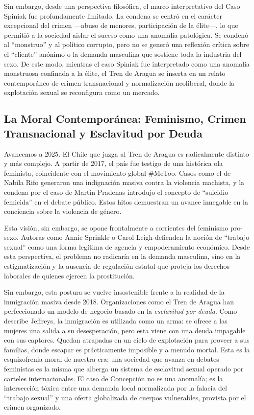 \documentclass[12pt, a4paper]{article}
\begin{document}
Sin embargo, desde una perspectiva filosófica, el marco interpretativo del Caso Spiniak fue profundamente limitado. La condena se centró en el carácter excepcional del crimen —abuso de menores, participación de la élite—, lo que permitió a la sociedad aislar el suceso como una anomalía patológica. Se condenó al ``monstruo'' y al político corrupto, pero no se generó una reflexión crítica sobre el ``cliente'' anónimo o la demanda masculina que sostiene toda la industria del sexo. De este modo, mientras el caso Spiniak fue interpretado como una anomalía monstruosa confinada a la élite, el Tren de Aragua se inserta en un relato contemporáneo de crimen transnacional y normalización neoliberal, donde la explotación sexual se reconfigura como un mercado.

\subsection*{La Moral Contemporánea: Feminismo, Crimen Transnacional y Esclavitud por Deuda}

Avancemos a 2025. El Chile que juzga al Tren de Aragua es radicalmente distinto y más complejo. A partir de 2017, el país fue testigo de una histórica ola feminista, coincidente con el movimiento global \#MeToo. Casos como el de Nabila Rifo generaron una indignación masiva contra la violencia machista, y la condena por el caso de Martín Pradenas introdujo el concepto de ``suicidio femicida'' en el debate público. Estos hitos demuestran un avance innegable en la conciencia sobre la violencia de género.

Esta visión, sin embargo, se opone frontalmente a corrientes del feminismo pro-sexo. Autoras como Annie Sprinkle o Carol Leigh defienden la noción de ``trabajo sexual'' como una forma legítima de agencia y empoderamiento económico. Desde esta perspectiva, el problema no radicaría en la demanda masculina, sino en la estigmatización y la ausencia de regulación estatal que proteja los derechos laborales de quienes ejercen la prostitución.

\newpage

Sin embargo, esta postura se vuelve insostenible frente a la realidad de la inmigración masiva desde 2018. Organizaciones como el Tren de Aragua han perfeccionado un modelo de negocio basado en la \textit{esclavitud por deuda}. Como describe Jeffreys, la inmigración es utilizada como un arma: se ofrece a las mujeres una salida a su desesperación, pero esta viene con una deuda impagable con sus captores. Quedan atrapadas en un ciclo de explotación para proveer a sus familias, donde escapar es prácticamente imposible y a menudo mortal. Esta es la esquizofrenia moral de nuestra era: una sociedad que avanza en debates feministas es la misma que alberga un sistema de esclavitud sexual operado por carteles internacionales. El caso de Concepción no es una anomalía; es la intersección tóxica entre una demanda local normalizada por la falacia del ``trabajo sexual'' y una oferta globalizada de cuerpos vulnerables, provista por el crimen organizado.
\end{document}
